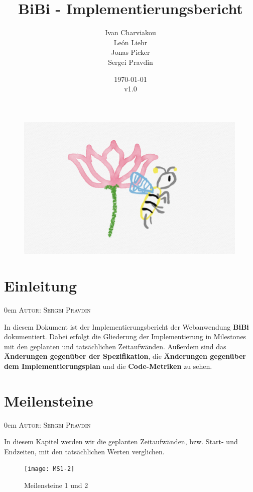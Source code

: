 \documentclass{article}
\title{BiBi - Implementierungsbericht}
\date{\today\\v1.0}
\author{
	Ivan Charviakou\\
	León Liehr\\
	Jonas Picker\\
	Sergei Pravdin
}
\makeatletter
\newcommand{\sectionauthor}[1]{
	{\parindent 0em \large \scshape Autor: #1 \par \nobreak \vspace*{1em}}
	\@afterheading
}
\makeatother
\begin{document}
\maketitle
\begin{figure}[H]
	\centering
	\includegraphics[width = 30em]{Logo}
\end{figure}
\newpage
\tableofcontents
\newpage


\section{Einleitung}%
\sectionauthor{Sergei Pravdin}
In diesem Dokument ist der Implementierungsbericht der Webanwendung \textbf{BiBi} dokumentiert. Dabei erfolgt die Gliederung der Implementierung in Milestones mit den geplanten und tatsächlichen Zeitaufwänden. Außerdem sind das \textbf{Änderungen gegenüber der Spezifikation}, die \textbf{Änderungen gegenüber dem Implementierungsplan} und die \textbf{Code-Metriken} zu sehen.

\section{Meilensteine}
\sectionauthor{Sergei Pravdin}
In diesem Kapitel werden wir die geplanten Zeitaufwänden, bzw. Start- und Endzeiten, mit den tatsächlichen Werten verglichen.

\begin{figure}[h]
    \centering
    \texttt{[image: MS1-2]}
    \caption{Meilensteine 1 und 2}
\end{figure}
\restoregeometry
\end{document}
